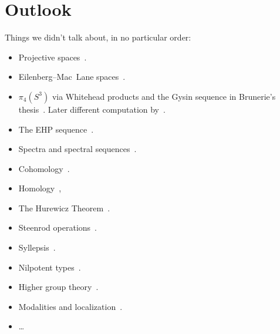 \documentclass[10pt,oneside,leqno,openright]{memoir}
\begin{document}
\chapter{Outlook}

Things we didn't talk about, in no particular order:
\begin{itemize}
\item  Projective spaces~\parencite{BuchholtzRijke2017}.
\item  Eilenberg--Mac~Lane spaces~\parencite{LicataFinster,BCFR-Central,Warn2023}.
\item  $\pi_4(S^3)$ via Whitehead products and the Gysin sequence in Brunerie's thesis~\parencite{BruneriePhD}. Later different computation by~\textcite{FormalBrunerie}.
\item The EHP sequence~\parencite{SnSymm}.
\item Spectra and spectral sequences~\parencite{Doorn2018}.
\item Cohomology~\parencite{BuchholtzFavonia,AgdaCohomology}.
\item Homology~\parencite{GrahamHomology},
\item The Hurewicz Theorem~\parencite{CS-Hurewicz}.
\item Steenrod operations~\parencite{Brunerie_Steenrod}.
\item Syllepsis~\parencite{syllepsis}.
\item Nilpotent types~\parencite{Scoccola_2020}.
\item Higher group
  theory~\parencite{BuchholtzDoornRijke2018,Buchholtz_Rijke_2023,Symmetry,Swan2022}.
\item Modalities and
  localization~\parencite{RSS,CORS,CR-LexModalities,Myers2022,myers2023commuting}.
\item \ldots
\end{itemize}

\backmatter

\nocite{*}

\raggedright
\printbibliography
\end{document}
